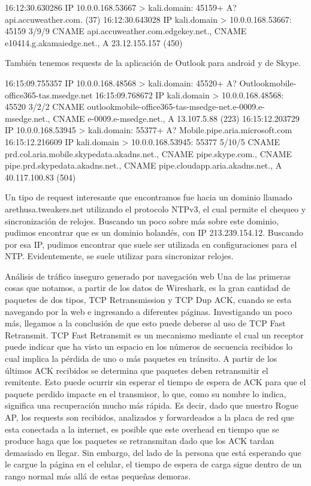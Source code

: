 16:12:30.630286 IP 10.0.0.168.53667 > kali.domain: 45159+ A? api.accuweather.com. (37)
16:12:30.643028 IP kali.domain > 10.0.0.168.53667: 45159 3/9/9 CNAME api.accuweather.com.edgekey.net., CNAME e10414.g.akamaiedge.net., A 23.12.155.157 (450)

También tenemos requests de la aplicación de Outlook para android y de Skype.

16:15:09.755357 IP 10.0.0.168.48568 > kali.domain: 45520+ A? Outlookmobile-office365-tas.msedge.net
16:15:09.768672 IP kali.domain > 10.0.0.168.48568: 45520 3/2/2 CNAME outlookmobile-office365-tas-msedge-net.e-0009.e-msedge.net., CNAME e-0009.e-msedge.net., A 13.107.5.88 (223)
16:15:12.203729 IP 10.0.0.168.53945 > kali.domain: 55377+ A? Mobile.pipe.aria.microsoft.com
16:15:12.216609 IP kali.domain > 10.0.0.168.53945: 55377 5/10/5 CNAME prd.col.aria.mobile.skypedata.akadns.net., CNAME pipe.skype.com., CNAME pipe.prd.skypedata.akadns.net., CNAME pipe.cloudapp.aria.akadns.net., A 40.117.100.83 (504)

Un tipo de request interesante que encontramos fue hacia un dominio llamado 	arethusa.tweakers.net utilizando el protocolo NTPv3, el cual permite el chequeo y sincronización de relojes. Buscando un poco sobre más sobre este dominio, pudimos encontrar que es un dominio holandés, con IP 213.239.154.12. Buscando por esa IP, pudimos encontrar que suele ser utilizada en configuraciones para el NTP. Evidentemente, se suele utilizar para sincronizar relojes.

Análisis de tráfico inseguro generado por navegación web
Una de las primeras cosas que notamos, a partir de los datos de Wireshark, es la gran cantidad de paquetes de dos tipos, TCP Retransmission y TCP Dup ACK, cuando se esta navegando por la web e ingresando a diferentes páginas. Investigando un poco más, llegamos a la conclusión de que esto puede deberse al uso de TCP Fast Retransmit. TCP Fast Retransmit es un mecanismo mediante el cual un receptor puede indicar que ha visto un espacio en los números de secuencia recibidos lo cual implica la pérdida de uno o más paquetes en tránsito. A partir de los últimos ACK recibidos se determina que paquetes deben retransmitir el remitente. Esto puede ocurrir sin esperar el tiempo de espera de ACK para que el paquete perdido impacte en el transmisor, lo que, como su nombre lo indica, significa una recuperación mucho más rápida. Es decir, dado que nuestro Rogue AP, los requests son recibidos, analizados y forwardeados a la placa de red que esta conectada a la internet, es posible que este overhead en tiempo que se produce haga que los paquetes se retransmitan dado que los ACK tardan demasiado en llegar. Sin embargo, del lado de la persona que está esperando que le cargue la página en el celular, el tiempo de espera de carga sigue dentro de un rango normal más allá de estas pequeñas demoras.

